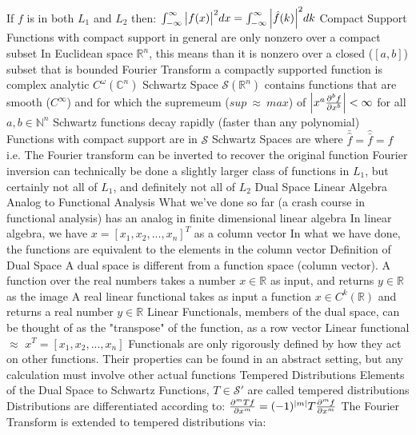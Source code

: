 \documentclass[14pt]{extarticle}
\begin{document}
\begin{outline}
					\3	If $f$ is in both $L_1$ and $L_2$ then:
					\3	$\int_{-\infty}^{\infty} \abs{f(x)}^2 dx = \int_{-\infty}^{\infty} \abs{\hat{f}(k)}^2 dk$
			\1	Compact Support
				\2	Functions with compact support in general are only nonzero over a compact subset
				\2	In Euclidean space $\mathbb{R}^n$, this means than it is nonzero
						over a closed ($[a,b]$) subset that is bounded
				\2	Fourier Transform a compactly supported function is complex analytic $C^{\omega}(\mathbb{C}^n)$
			\1	Schwartz Space
				\2	$\mathscr{S}(\mathbb{R}^n)$ contains functions that are smooth
						($C^{\infty}$) and for which the supremeum ($sup~\approx~max$)
						of $\abs{x^a \pd[b]{f}{x}} < \infty$ for all $a,b \in \mathbb{N}^n$
				\2	Schwartz functions decay rapidly (faster than any polynomial)
				\2	Functions with compact support are in $\mathscr{S}$
				\2 Schwartz Spaces are where $\bar{\hat{f}} = \hat{\bar{f}} = f$
					\3	i.e. The Fourier transform can be inverted to recover the original function
					\3	Fourier inversion can technically be done a slightly larger class
							of functions in $L_1$, but certainly not all of $L_1$, and definitely
							not all of $L_2$	
			\1	Dual Space 
				\2	Linear Algebra Analog to Functional Analysis
					\3	What we've done so far (a crash course in functional analysis) has
							an analog in finite dimensional linear algebra
					\3	In linear algebra, we have  $x = [x_1,x_2,...,x_n]^T$ as
							a column vector
					\3	In what we have done, the functions are equivalent to the elements
							in the column vector
				\2	Definition of Dual Space
					\3	A dual space is different from a function space (column vector).
					\3	A function over the real numbers takes a number $x \in \mathbb{R}$
							as input, and returns $y \in \mathbb{R}$ as the image
					\3	A real linear functional takes as input a function $x \in C^k(\mathbb{R})$
							and returns a real number $y \in \mathbb{R}$
					\3	Linear Functionals, members of the dual space, can be thought of
							as the "transpose" of the function, as a row vector
					\3	Linear functional $\approx$ $x^T = [x_1,x_2,...,x_n]$
				\2	Functionals are only rigorously defined by how they
						act on other functions.  Their properties can be found in an abstract
						setting, but any calculation must involve other actual functions
			\1	Tempered Distributions
				\2	Elements of the Dual Space to Schwartz Functions, $T \in \mathscr{S}'$
						are called tempered distributions
				\2	Distributions are differentiated according to:
					\3	$\pd[m]{Tf}{x} = (-1)^{\abs{m}} T \pd[m]{f}{x}$
				\2	The Fourier Transform is extended to tempered distributions via:

\end{outline}
\end{document}
